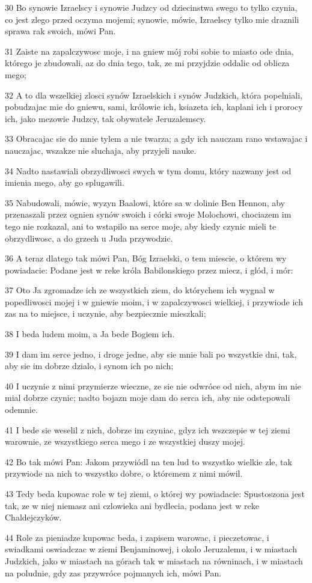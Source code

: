 \par 30 Bo synowie Izraelscy i synowie Judzcy od dziecinstwa swego to tylko czynia, co jest zlego przed oczyma mojemi; synowie, mówie, Izraelscy tylko mie draznili sprawa rak swoich, mówi Pan.
\par 31 Zaiste na zapalczywosc moje, i na gniew mój robi sobie to miasto ode dnia, którego je zbudowali, az do dnia tego, tak, ze mi przyjdzie oddalic od oblicza mego;
\par 32 A to dla wszelkiej zlosci synów Izraelskich i synów Judzkich, która popelniali, pobudzajac mie do gniewu, sami, królowie ich, ksiazeta ich, kaplani ich i prorocy ich, jako mezowie Judzcy, tak obywatele Jeruzalemscy.
\par 33 Obracajac sie do mnie tylem a nie twarza; a gdy ich nauczam rano wstawajac i nauczajac, wszakze nie sluchaja, aby przyjeli nauke.
\par 34 Nadto nastawiali obrzydliwosci swych w tym domu, który nazwany jest od imienia mego, aby go splugawili.
\par 35 Nabudowali, mówie, wyzyn Baalowi, które sa w dolinie Ben Hennon, aby przenaszali przez ognien synów swoich i córki swoje Molochowi, chociazem im tego nie rozkazal, ani to wstapilo na serce moje, aby kiedy czynic mieli te obrzydliwosc, a do grzech u Juda przywodzic.
\par 36 A teraz dlatego tak mówi Pan, Bóg Izraelski, o tem miescie, o którem wy powiadacie: Podane jest w reke króla Babilonskiego przez miecz, i glód, i mór:
\par 37 Oto Ja zgromadze ich ze wszystkich ziem, do którychem ich wygnal w popedliwosci mojej i w gniewie moim, i w zapalczywosci wielkiej, i przywiode ich zas na to miejsce, i uczynie, aby bezpiecznie mieszkali;
\par 38 I beda ludem moim, a Ja bede Bogiem ich.
\par 39 I dam im serce jedno, i droge jedne, aby sie mnie bali po wszystkie dni, tak, aby sie im dobrze dzialo, i synom ich po nich;
\par 40 I uczynie z nimi przymierze wieczne, ze sie nie odwróce od nich, abym im nie mial dobrze czynic; nadto bojazn moje dam do serca ich, aby nie odstepowali odemnie.
\par 41 I bede sie weselil z nich, dobrze im czyniac, gdyz ich wszczepie w tej ziemi warownie, ze wszystkiego serca mego i ze wszystkiej duszy mojej.
\par 42 Bo tak mówi Pan: Jakom przywiódl na ten lud to wszystko wielkie zle, tak przywiode na nich to wszystko dobre, o któremem z nimi mówil.
\par 43 Tedy beda kupowac role w tej ziemi, o której wy powiadacie: Spustoszona jest tak, ze w niej niemasz ani czlowieka ani bydlecia, podana jest w reke Chaldejczyków.
\par 44 Role za pieniadze kupowac beda, i zapisem warowac, i pieczetowac, i swiadkami oswiadczac w ziemi Benjaminowej, i okolo Jeruzalemu, i w miastach Judzkich, jako w miastach na górach tak w miastach na równinach, i w miastach na poludnie, gdy zas przywróce pojmanych ich, mówi Pan.

